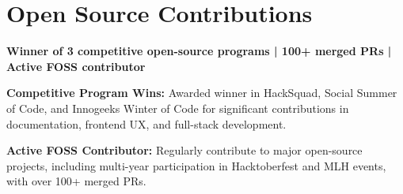 \section{Open Source Contributions}

\noindent\textbf{Winner of 3 competitive open-source programs | 100+ merged PRs | Active FOSS contributor}

\begin{itemizecompact}
    \item \textbf{Competitive Program Wins:} Awarded winner in HackSquad, Social Summer of Code, and Innogeeks Winter of Code for significant contributions in documentation, frontend UX, and full-stack development.
    \item \textbf{Active FOSS Contributor:} Regularly contribute to major open-source projects, including multi-year participation in Hacktoberfest and MLH events, with over 100+ merged PRs.
\end{itemizecompact}
